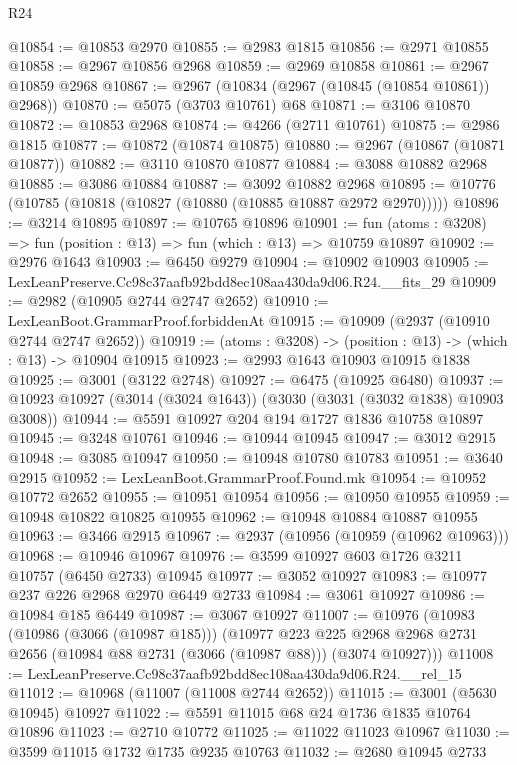 \begin{lexlean}{R24}
\begin{coremodule}
@10854 := @10853 @2970
@10855 := @2983 @1815
@10856 := @2971 @10855
@10858 := @2967 @10856 @2968
@10859 := @2969 @10858
@10861 := @2967 @10859 @2968
@10867 := @2967 (@10834 (@2967 (@10845 (@10854 @10861)) @2968))
@10870 := @5075 (@3703 @10761) @68
@10871 := @3106 @10870
@10872 := @10853 @2968
@10874 := @4266 (@2711 @10761)
@10875 := @2986 @1815
@10877 := @10872 (@10874 @10875)
@10880 := @2967 (@10867 (@10871 @10877))
@10882 := @3110 @10870 @10877
@10884 := @3088 @10882 @2968
@10885 := @3086 @10884
@10887 := @3092 @10882 @2968
@10895 := @10776 (@10785 (@10818 (@10827 (@10880 (@10885 @10887 @2972 @2970)))))
@10896 := @3214 @10895
@10897 := @10765 @10896
@10901 := fun (atoms : @3208) => fun (position : @13) => fun (which : @13) => @10759 @10897
@10902 := @2976 @1643
@10903 := @6450 @9279
@10904 := @10902 @10903
@10905 := LexLeanPreserve.Cc98c37aafb92bdd8ec108aa430da9d06.R24.__fits_29
@10909 := @2982 (@10905 @2744 @2747 @2652)
@10910 := LexLeanBoot.GrammarProof.forbiddenAt
@10915 := @10909 (@2937 (@10910 @2744 @2747 @2652))
@10919 := (atoms : @3208) -> (position : @13) -> (which : @13) -> @10904 @10915
@10923 := @2993 @1643 @10903 @10915 @1838
@10925 := @3001 (@3122 @2748)
@10927 := @6475 (@10925 @6480)
@10937 := @10923 @10927 (@3014 (@3024 @1643)) (@3030 (@3031 (@3032 @1838) @10903 @3008))
@10944 := @5591 @10927 @204 @194 @1727 @1836 @10758 @10897
@10945 := @3248 @10761
@10946 := @10944 @10945
@10947 := @3012 @2915
@10948 := @3085 @10947
@10950 := @10948 @10780 @10783
@10951 := @3640 @2915
@10952 := LexLeanBoot.GrammarProof.Found.mk
@10954 := @10952 @10772 @2652
@10955 := @10951 @10954
@10956 := @10950 @10955
@10959 := @10948 @10822 @10825 @10955
@10962 := @10948 @10884 @10887 @10955
@10963 := @3466 @2915
@10967 := @2937 (@10956 (@10959 (@10962 @10963)))
@10968 := @10946 @10967
@10976 := @3599 @10927 @603 @1726 @3211 @10757 (@6450 @2733) @10945
@10977 := @3052 @10927
@10983 := @10977 @237 @226 @2968 @2970 @6449 @2733
@10984 := @3061 @10927
@10986 := @10984 @185 @6449
@10987 := @3067 @10927
@11007 := @10976
    (@10983
      (@10986 (@3066 (@10987 @185)))
      (@10977
        @223
        @225
        @2968
        @2968
        @2731
        @2656
        (@10984 @88 @2731 (@3066 (@10987 @88)))
        (@3074 @10927)))
@11008 := LexLeanPreserve.Cc98c37aafb92bdd8ec108aa430da9d06.R24.__rel_15
@11012 := @10968 (@11007 (@11008 @2744 @2652))
@11015 := @3001 (@5630 @10945) @10927
@11022 := @5591 @11015 @68 @24 @1736 @1835 @10764 @10896
@11023 := @2710 @10772
@11025 := @11022 @11023 @10967
@11030 := @3599 @11015 @1732 @1735 @9235 @10763
@11032 := @2680 @10945 @2733

\end{coremodule}
\end{lexlean}
